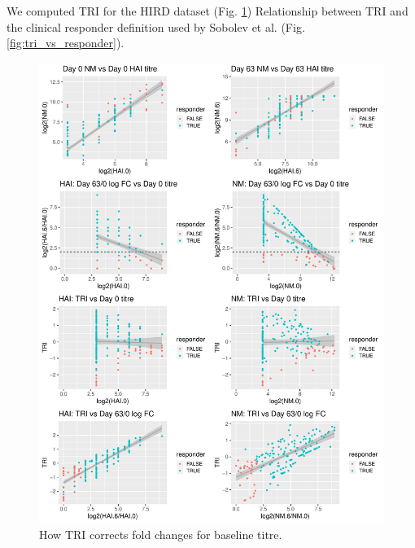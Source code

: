 
We computed TRI for the HIRD dataset (Fig. \ref{fig:tri_vs_fc})
Relationship between TRI and the clinical responder definition used by Sobolev et al. (Fig. \ref{fig:tri_vs_responder}).

\begin{figure}
    \includegraphics[width=1.0\textwidth]{mainmatter/figures/chapter_02/phenotype_data_setup.tri_comparison.pdf}
    \caption{How TRI corrects fold changes for baseline titre.}
    \label{fig:tri_vs_fc}
\end{figure} 

